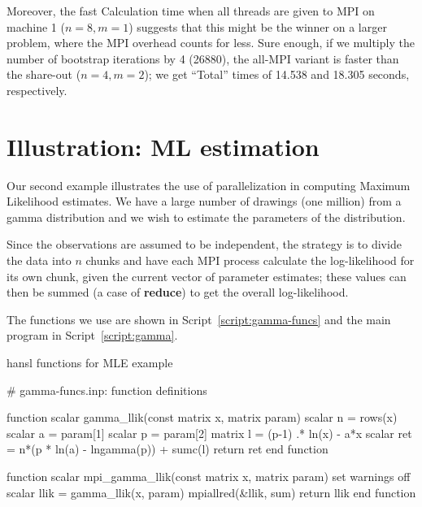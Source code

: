 \documentclass{article}
\begin{document}
Moreover, the fast Calculation time when all threads are given to MPI
on machine 1 ($n=8,m=1$) suggests that this might be the winner on a
larger problem, where the MPI overhead counts for less. Sure enough,
if we multiply the number of bootstrap iterations by 4 (26880), the
all-MPI variant is faster than the share-out ($n=4, m=2$); we get
``Total'' times of 14.538 and 18.305 seconds, respectively.

\section{Illustration: ML estimation}
\label{sec:gamma}

Our second example illustrates the use of parallelization in computing
Maximum Likelihood estimates. We have a large number of drawings (one
million) from a gamma distribution and we wish to estimate the
parameters of the distribution.

Since the observations are assumed to be independent, the strategy is
to divide the data into $n$ chunks and have each MPI process calculate
the log-likelihood for its own chunk, given the current vector of
parameter estimates; these values can then be summed (a case of
\textbf{reduce}) to get the overall log-likelihood.

The functions we use are shown in Script~\ref{script:gamma-funcs} and
the main program in Script~\ref{script:gamma}.

\begin{script}[htbp]
  \caption{hansl functions for MLE example}
  \label{script:gamma-funcs}
\begin{scode}
# gamma-funcs.inp: function definitions

function scalar gamma_llik(const matrix x, matrix param)
  scalar n = rows(x)
  scalar a = param[1]
  scalar p = param[2]
  matrix l =  (p-1) .* ln(x) - a*x
  scalar ret = n*(p * ln(a) - lngamma(p)) + sumc(l)
  return ret
end function
 
function scalar mpi_gamma_llik(const matrix x, matrix param)
  set warnings off
  scalar llik = gamma_llik(x, param)
  mpiallred(&llik, sum)
  return llik
end function
\end{scode}
\end{script}
\end{document}
